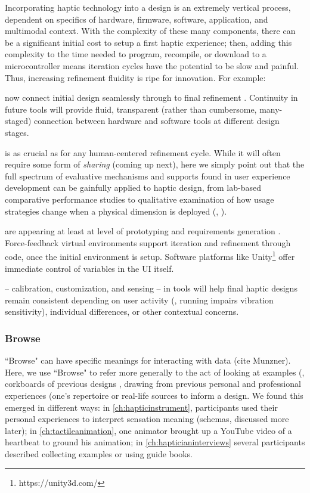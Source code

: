 Incorporating haptic technology into a design is an extremely vertical process,  dependent on  specifics of hardware, firmware, software, application, and multimodal context.
With the complexity of these many components, there can be a significant initial cost to setup a first haptic experience; then, adding this complexity to the time needed to program, recompile, or download to a microcontroller means iteration cycles have the potential to be slow and painful. 
%
Thus, increasing refinement fluidity is ripe for innovation. For example:

 now connect initial design seamlessly through to final refinement \cite{schneider2015tactile,Schneider2016macaron}.
Continuity in future tools will provide fluid, transparent (rather than cumbersome, many-staged) connection between hardware and software tools at different design stages.

 is as crucial as for any human-centered refinement cycle. While it will often require some form of \textit{sharing} (coming up next), here we simply point out that the full spectrum of evaluative mechanisms and supports found in user experience development can be gainfully applied to haptic design, from lab-based comparative performance studies to qualitative examination of how usage strategies change when a physical dimension is deployed (\eg, \cite{minaker:2016:EH:handson}).

 are appearing at least at level of prototyping and requirements generation \cite{SchneiderAsiaHaptics2014,Seifi2014}. 
Force-feedback virtual environments support iteration and refinement through code, once the initial environment is setup.
Software platforms like Unity\footnote{https://unity3d.com/} offer immediate control of variables in the UI itself.

 -- calibration, customization, and sensing -- in tools will help final haptic designs remain consistent depending on user activity (\eg, running impairs vibration sensitivity), individual differences, or other contextual concerns.


%
%
\subsubsection{Browse} 
``Browse" can have specific meanings for interacting with data (cite Munzner).
Here, we use ``Browse" to refer more generally to the act of looking at examples (\eg, corkboards of previous designs \cite{Buxton2007}, drawing from previous personal and professional experiences (\eg one's repertoire \cite{Schon1982} or real-life sources to inform a design.
We found this emerged in different ways:
in \autoref{ch:hapticinstrument}, participants used their personal experiences to interpret sensation meaning (\ie schemas, discussed more later);
in \autoref{ch:tactileanimation}, one animator brought up a YouTube video of a heartbeat to ground his animation;
in \autoref{ch:hapticianinterviews} several participants described collecting examples or using guide books.

